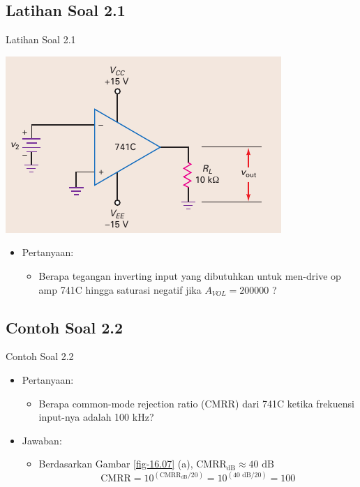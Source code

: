 \subsection{Latihan Soal 2.1}
\begin{frame}{Latihan Soal 2.1}
	\begin{multicols}{2}
		\begin{center}
			\includegraphics[width=\linewidth]{gambar/fig-16.11a}
		\end{center}
		\columnbreak
		\begin{itemize}
			\item Pertanyaan:
			\begin{itemize}
				\item Berapa tegangan inverting input yang dibutuhkan untuk men-drive op amp 741C hingga saturasi negatif jika $ A_{VOL} = 200000 $ ?
			\end{itemize}
		\end{itemize}
	\end{multicols}
\end{frame}

\subsection{Contoh Soal 2.2}
\begin{frame}{Contoh Soal 2.2}
	\begin{itemize}
		\item Pertanyaan:
		\begin{itemize}
			\item Berapa common-mode rejection ratio (CMRR) dari 741C ketika frekuensi input-nya adalah 100 kHz?
		\end{itemize}
		\item Jawaban:
		\begin{itemize}
			\item Berdasarkan Gambar \ref{fig-16.07} (a), $ \text{CMRR}_{\text{dB}} \approx 40 \text{ dB} $ 
			\[ \text{CMRR} = 10^{(\text{CMRR}_{\text{dB}}/20)} = 10^{(40 \text{ dB}/20)} = 100\]
		\end{itemize}
	\end{itemize}
\end{frame}

